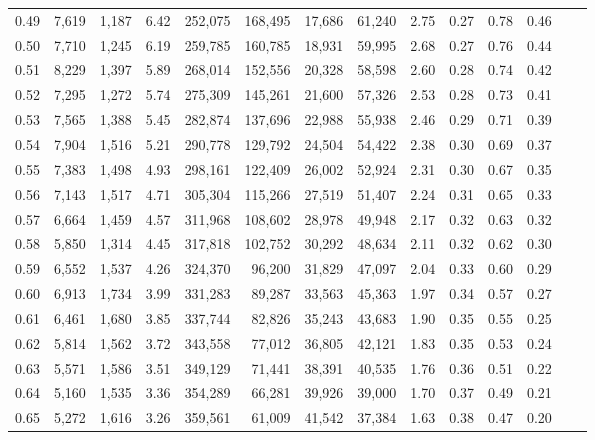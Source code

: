 \begin{tabular}{rrrrrrrrrrrrrr}
0.49 &  7,619 &  1,187 &     6.42 &  252,075 &  168,495 &  17,686 &  61,240 &  2.75 &  0.27 &  0.78 &      0.46 \\
0.50 &  7,710 &  1,245 &     6.19 &  259,785 &  160,785 &  18,931 &  59,995 &  2.68 &  0.27 &  0.76 &      0.44 \\
0.51 &  8,229 &  1,397 &     5.89 &  268,014 &  152,556 &  20,328 &  58,598 &  2.60 &  0.28 &  0.74 &      0.42 \\
0.52 &  7,295 &  1,272 &     5.74 &  275,309 &  145,261 &  21,600 &  57,326 &  2.53 &  0.28 &  0.73 &      0.41 \\
0.53 &  7,565 &  1,388 &     5.45 &  282,874 &  137,696 &  22,988 &  55,938 &  2.46 &  0.29 &  0.71 &      0.39 \\
0.54 &  7,904 &  1,516 &     5.21 &  290,778 &  129,792 &  24,504 &  54,422 &  2.38 &  0.30 &  0.69 &      0.37 \\
0.55 &  7,383 &  1,498 &     4.93 &  298,161 &  122,409 &  26,002 &  52,924 &  2.31 &  0.30 &  0.67 &      0.35 \\
0.56 &  7,143 &  1,517 &     4.71 &  305,304 &  115,266 &  27,519 &  51,407 &  2.24 &  0.31 &  0.65 &      0.33 \\
0.57 &  6,664 &  1,459 &     4.57 &  311,968 &  108,602 &  28,978 &  49,948 &  2.17 &  0.32 &  0.63 &      0.32 \\
0.58 &  5,850 &  1,314 &     4.45 &  317,818 &  102,752 &  30,292 &  48,634 &  2.11 &  0.32 &  0.62 &      0.30 \\
0.59 &  6,552 &  1,537 &     4.26 &  324,370 &   96,200 &  31,829 &  47,097 &  2.04 &  0.33 &  0.60 &      0.29 \\
0.60 &  6,913 &  1,734 &     3.99 &  331,283 &   89,287 &  33,563 &  45,363 &  1.97 &  0.34 &  0.57 &      0.27 \\
0.61 &  6,461 &  1,680 &     3.85 &  337,744 &   82,826 &  35,243 &  43,683 &  1.90 &  0.35 &  0.55 &      0.25 \\
0.62 &  5,814 &  1,562 &     3.72 &  343,558 &   77,012 &  36,805 &  42,121 &  1.83 &  0.35 &  0.53 &      0.24 \\
0.63 &  5,571 &  1,586 &     3.51 &  349,129 &   71,441 &  38,391 &  40,535 &  1.76 &  0.36 &  0.51 &      0.22 \\
0.64 &  5,160 &  1,535 &     3.36 &  354,289 &   66,281 &  39,926 &  39,000 &  1.70 &  0.37 &  0.49 &      0.21 \\
0.65 &  5,272 &  1,616 &     3.26 &  359,561 &   61,009 &  41,542 &  37,384 &  1.63 &  0.38 &  0.47 &      0.20 \\

\end{tabular}
